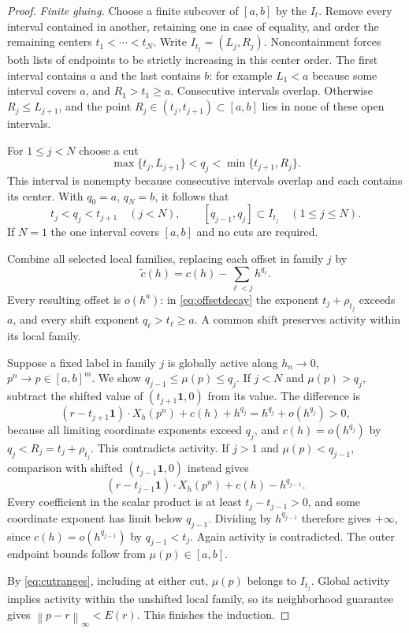 \documentclass[11pt]{article}
\theoremstyle{definition}
\theoremstyle{remark}
\newcommand{\one}{\mathbf 1}
\newcommand{\norm}[1]{\left\|#1\right\|}
\numberwithin{equation}{section}
\begin{document}
\begin{proof}
\medskip
\noindent\emph{Finite gluing.}
Choose a finite subcover of $[a,b]$ by the $I_t$. Remove every
interval contained in another, retaining one in case of equality,
and order the remaining centers $t_1<\cdots<t_N$. Write
$I_{t_j}=(L_j,R_j)$. Noncontainment forces both lists of endpoints
to be strictly increasing in this center order. The first interval
contains $a$ and the last contains $b$: for example $L_1<a$ because
some interval covers $a$, and $R_1>t_1\geq a$.
Consecutive intervals overlap. Otherwise $R_j\leq L_{j+1}$,
and the point $R_j\in(t_j,t_{j+1})\subset[a,b]$ lies in none
of these open intervals.

For $1\leq j<N$ choose a cut
\begin{equation}
 \max\{t_j,L_{j+1}\}<q_j<\min\{t_{j+1},R_j\}.
 \label{eq:cutchoice}
\end{equation}
This interval is nonempty because consecutive intervals overlap
and each contains its center. With $q_0=a$, $q_N=b$, it follows
that
\begin{equation}
 t_j<q_j<t_{j+1}\quad(j<N),\qquad
 [q_{j-1},q_j]\subset I_{t_j}\quad(1\leq j\leq N).
 \label{eq:cutranges}
\end{equation}
If $N=1$ the one interval covers $[a,b]$ and no cuts are required.

Combine all selected local families, replacing each offset in
family $j$ by
\begin{equation}
 \widetilde c(h)=c(h)-\sum_{\ell<j}h^{q_\ell}.
 \label{eq:shifts}
\end{equation}
Every resulting offset is $o(h^a)$: in \eqref{eq:offsetdecay}
the exponent $t_j+\rho_{t_j}$ exceeds $a$, and every shift
exponent $q_\ell>t_\ell\geq a$. A common shift preserves activity
within its local family.

Suppose a fixed label in family $j$ is globally active along
$h_n\to0$, $p^n\to p\in[a,b]^m$. We show
$q_{j-1}\leq\mu(p)\leq q_j$. If $j<N$ and $\mu(p)>q_j$,
subtract the shifted value of $(t_{j+1}\one,0)$ from its value.
The difference is
\[
 (r-t_{j+1}\one)\cdot X_h(p^n)+c(h)+h^{q_j}
             =h^{q_j}+o(h^{q_j})>0,
\]
because all limiting coordinate exponents exceed $q_j$, and
$c(h)=o(h^{q_j})$ by $q_j<R_j=t_j+\rho_{t_j}$. This contradicts
activity. If $j>1$ and $\mu(p)<q_{j-1}$, comparison with shifted
$(t_{j-1}\one,0)$ instead gives
\[
 (r-t_{j-1}\one)\cdot X_h(p^n)+c(h)-h^{q_{j-1}}.
\]
Every coefficient in the scalar product is at least
$t_j-t_{j-1}>0$, and some coordinate exponent has limit below
$q_{j-1}$. Dividing by $h^{q_{j-1}}$ therefore gives $+\infty$,
since $c(h)=o(h^{q_{j-1}})$ by $q_{j-1}<t_j$. Again activity
is contradicted. The outer endpoint bounds follow from
$\mu(p)\in[a,b]$.

By \eqref{eq:cutranges}, including at either cut, $\mu(p)$ belongs
to $I_{t_j}$. Global activity implies activity within the
unshifted local family, so its neighborhood guarantee gives
$\norm{p-r}_\infty<E(r)$. This finishes the induction.
\end{proof}
\end{document}
